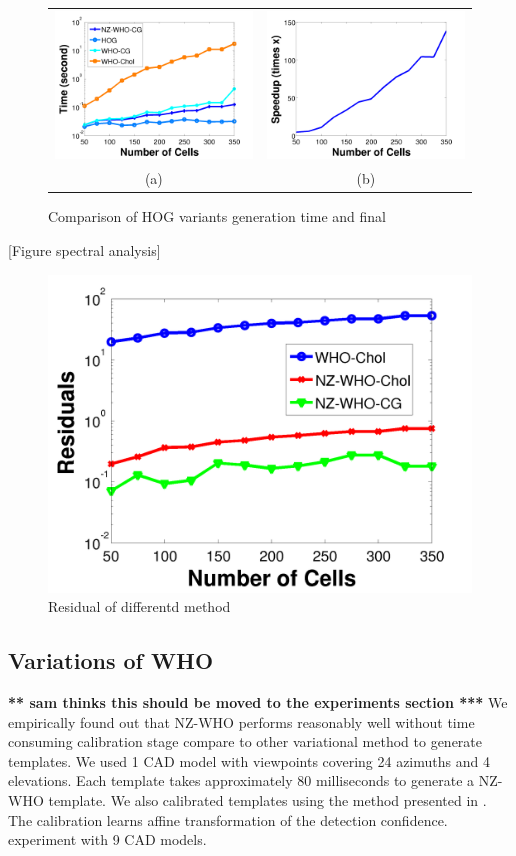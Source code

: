 \documentclass[10pt,twocolumn,letterpaper]{article}
\newcommand{\scream}[1]{{\color{red} \bf *** #1 ***}}
\begin{document}
\begin{figure}[t]
  \begin{center}
  \begin{tabular}{cc}
     \includegraphics[width=0.5\linewidth]{whotime} & 
     \includegraphics[width=0.5\linewidth]{speedup}\\
     (a) & (b) \\
 \end{tabular}
  \end{center}
  \caption{Comparison of HOG variants generation time and final }
  \label{fig:whotime}
\end{figure}
[Figure spectral analysis]

\begin{figure}[t]
  \centering
  \includegraphics[width=0.5\linewidth]{residual}
  \caption{Residual of differentd method}
  \label{fig:whotime}
\end{figure}

\subsection{Variations of WHO}
\scream{sam thinks this should be moved to the experiments section}
We empirically found out that NZ-WHO performs reasonably well without time
consuming calibration stage compare to other variational method to generate
templates. We used 1 CAD model with viewpoints covering 24 azimuths and 4
elevations. Each template takes approximately 80 milliseconds to generate a
NZ-WHO template. We also calibrated templates using the method presented in
\cite{Aubry14}. The calibration learns affine transformation of the detection
confidence.%
experiment with 9 CAD models.
\end{document}
